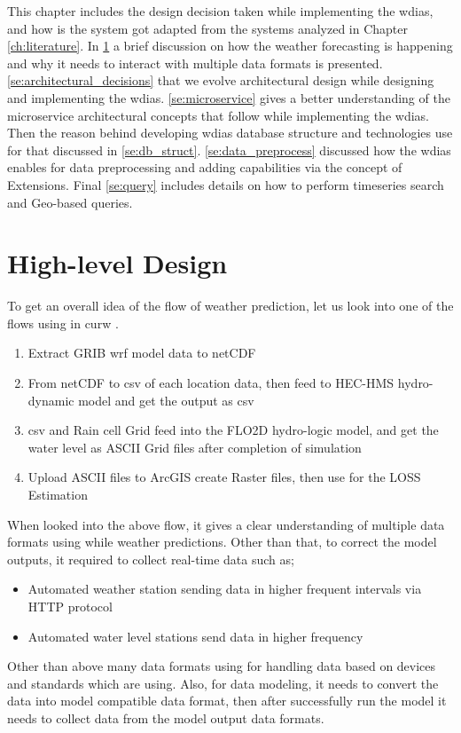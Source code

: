 This chapter includes the design decision taken while implementing the \acrfull{wdias}, and how is the system got adapted from the systems analyzed in Chapter \ref{ch:literature}.
In \cref{se:high_level_design} a brief discussion on how the weather forecasting is happening and why it needs to interact with multiple data formats is presented.
\cref{se:architectural_decisions} that we evolve architectural design while designing and implementing the \acrshort{wdias}.
\cref{se:microservice} gives a better understanding of the microservice architectural concepts that follow while implementing the \acrshort{wdias}.
Then the reason behind developing \acrshort{wdias} database structure and technologies use for that discussed in \cref{se:db_struct}.
\cref{se:data_preprocess} discussed how the \acrshort{wdias} enables for data preprocessing and adding capabilities via the concept of Extensions.
Final \cref{se:query} includes details on how to perform timeseries search and Geo-based queries.

\section{High-level Design}
\label{se:high_level_design}

To get an overall idea of the flow of weather prediction, let us look into one of the flows using in \acrshort{curw} \cite{CUrWSL2017SL}.

\begin{enumerate}
    \item Extract \acrshort{GRIB} \acrshort{wrf} model data to \acrshort{netCDF}
    \item From \acrshort{netCDF} to \acrshort{csv} of each location data, then feed to HEC-HMS hydro-dynamic model and get the output as \acrshort{csv}
    \item \acrshort{csv} and Rain cell Grid feed into the FLO2D hydro-logic model, and get the water level as ASCII Grid files after completion of simulation
    \item Upload ASCII files to ArcGIS create Raster files, then use for the LOSS Estimation
\end{enumerate}
When looked into the above flow, it gives a clear understanding of multiple data formats using while weather predictions.
Other than that, to correct the model outputs, it required to collect real-time data such as;
\begin{itemize}
    \item Automated weather station sending data in higher frequent intervals via HTTP protocol
    \item Automated water level stations send data in higher frequency
\end{itemize}
Other than above many data formats using for handling data based on devices and standards which are using. Also, for data modeling, it needs to convert the data into model compatible data format, then after successfully run the model it needs to collect data from the model output data formats.

